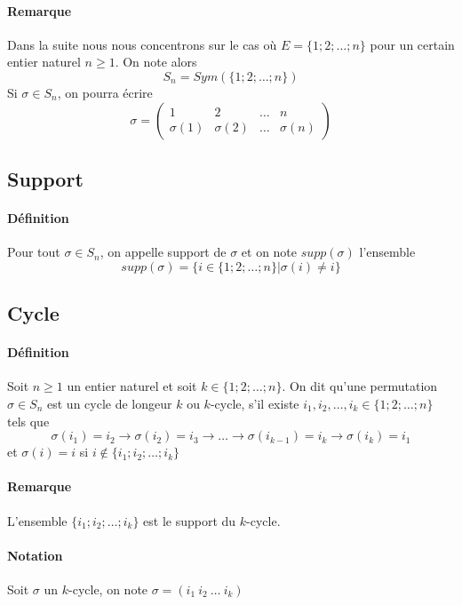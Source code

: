 \paragraph{Remarque} Dans la suite nous nous concentrons sur le cas où $E = \{1; 2; \ldots; n\}$ pour un certain entier naturel $n\geq 1$. On note alors
$$S_n = Sym(\{1; 2; \ldots; n\})$$
Si $\sigma \in S_n$, on pourra écrire
$$\sigma = \begin{pmatrix} 1 & 2 & \ldots & n \\ \sigma(1) & \sigma(2) & \ldots & \sigma(n) \end{pmatrix}$$

%
\subsection{Support}
%
\paragraph{Définition} Pour tout $\sigma \in S_n$, on appelle support de $\sigma$ et on note $supp(\sigma)$ l'ensemble
$$supp(\sigma) = \{i \in \{1; 2; \ldots; n\} \vert \sigma(i) \neq i\}$$

%
\subsection{Cycle}
%
\paragraph{Définition} Soit $n \geq 1$ un entier naturel et soit $k \in \{1; 2; \ldots; n\}$. On dit qu'une permutation $\sigma \in S_n$ est un cycle de longeur $k$ ou $k$-cycle, s'il existe $i_1, i_2, \ldots, i_k \in  \{1; 2; \ldots; n\}$ tels que
$$\sigma(i_1) = i_2 \rightarrow \sigma(i_2) = i_3 \rightarrow \ldots \rightarrow \sigma(i_{k-1}) = i_k \rightarrow \sigma(i_k) = i_1$$
et $\sigma(i) = i$ si $i \notin \{i_1; i_2; \ldots; i_k\}$

\paragraph{Remarque} L'ensemble $\{i_1; i_2; \ldots; i_k\}$ est le support du $k$-cycle.

\paragraph{Notation} Soit $\sigma$ un $k$-cycle, on note $\sigma = (i_1 ~ i_2 ~ \ldots ~ i_k)$


